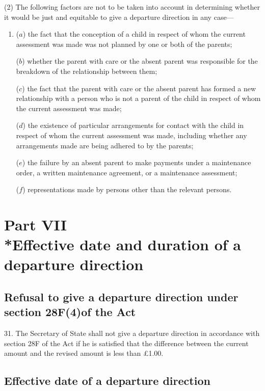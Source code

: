 \documentclass[a4paper]{article}
\newcommand{\parthead}{}
\begin{document}
(2) The following factors are not to be taken into account in determining
whether it would be just and equitable to give a departure direction in any
case—
\begin{enumerate}\item[]
($a$) the fact that the conception of a child in respect of whom the current
assessment was made was not planned by one or both of the parents;

($b$) whether the parent with care or the absent parent was responsible for the
breakdown of the relationship between them;

($c$) the fact that the parent with care or the absent parent has formed a new
relationship with a person who is not a parent of the child in respect of whom
the current assessment was made;

($d$) the existence of particular arrangements for contact with the child in
respect of whom the current assessment was made, including whether any
arrangements made are being adhered to by the parents;

($e$) the failure by an absent parent to make payments under a maintenance order, a
written maintenance agreement, or a maintenance assessment;

($f$) representations made by persons other than the relevant persons.
\end{enumerate}

\section[Part VII --- Effective date and duration of a departure direction]{Part VII\\*Effective date and duration of a departure direction}

\renewcommand\parthead{--- Part VII}

\subsection[31. Refusal to give a
departure direction under section 28F(4)of the Act]{Refusal to give a
departure direction under section 28F(4)of the Act}

31. The Secretary of State
shall not give a departure direction in accordance with section 28F of the Act
if he is satisfied that the difference between the current amount and the
revised amount is less than £1.00.

\subsection[32. Effective date of a departure direction]{Effective date of a departure direction}
\end{document}
